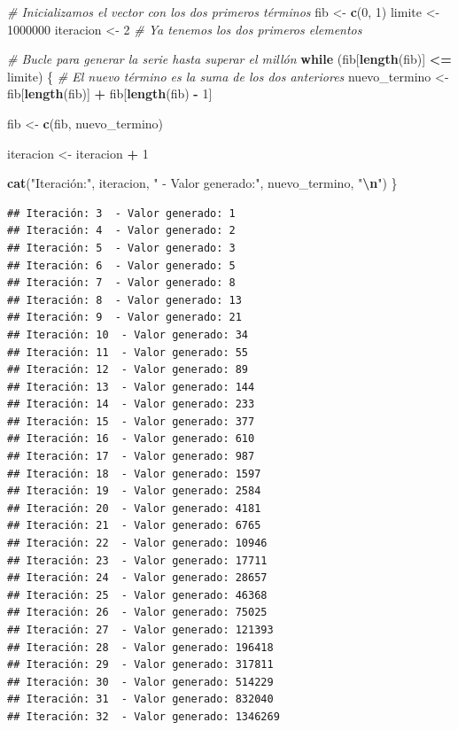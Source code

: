 \documentclass[]{llncs}
\newenvironment{Shaded}{\begin{snugshade}}{\end{snugshade}}
\newcommand{\CommentTok}[1]{\textcolor[rgb]{0.56,0.35,0.01}{\textit{#1}}}
\newcommand{\ControlFlowTok}[1]{\textcolor[rgb]{0.13,0.29,0.53}{\textbf{#1}}}
\newcommand{\DecValTok}[1]{\textcolor[rgb]{0.00,0.00,0.81}{#1}}
\newcommand{\FunctionTok}[1]{\textcolor[rgb]{0.13,0.29,0.53}{\textbf{#1}}}
\newcommand{\NormalTok}[1]{#1}
\newcommand{\OtherTok}[1]{\textcolor[rgb]{0.56,0.35,0.01}{#1}}
\newcommand{\SpecialCharTok}[1]{\textcolor[rgb]{0.81,0.36,0.00}{\textbf{#1}}}
\newcommand{\StringTok}[1]{\textcolor[rgb]{0.31,0.60,0.02}{#1}}
\begin{document}
\begin{Shaded}
\begin{Highlighting}[]
\CommentTok{\# Inicializamos el vector con los dos primeros términos}
\NormalTok{fib }\OtherTok{\textless{}{-}} \FunctionTok{c}\NormalTok{(}\DecValTok{0}\NormalTok{, }\DecValTok{1}\NormalTok{)}
\NormalTok{limite }\OtherTok{\textless{}{-}} \DecValTok{1000000}
\NormalTok{iteracion }\OtherTok{\textless{}{-}} \DecValTok{2} \CommentTok{\# Ya tenemos los dos primeros elementos}

\CommentTok{\# Bucle para generar la serie hasta superar el millón}
\ControlFlowTok{while}\NormalTok{ (fib[}\FunctionTok{length}\NormalTok{(fib)] }\SpecialCharTok{\textless{}=}\NormalTok{ limite) \{}
\CommentTok{\# El nuevo término es la suma de los dos anteriores}
\NormalTok{  nuevo\_termino }\OtherTok{\textless{}{-}}\NormalTok{ fib[}\FunctionTok{length}\NormalTok{(fib)] }\SpecialCharTok{+}\NormalTok{ fib[}\FunctionTok{length}\NormalTok{(fib) }\SpecialCharTok{{-}} \DecValTok{1}\NormalTok{]}
  
\NormalTok{  fib }\OtherTok{\textless{}{-}} \FunctionTok{c}\NormalTok{(fib, nuevo\_termino)}
  
\NormalTok{  iteracion }\OtherTok{\textless{}{-}}\NormalTok{ iteracion }\SpecialCharTok{+} \DecValTok{1}
  
  \FunctionTok{cat}\NormalTok{(}\StringTok{"Iteración:"}\NormalTok{, iteracion, }\StringTok{" {-} Valor generado:"}\NormalTok{, nuevo\_termino, }\StringTok{"}\SpecialCharTok{\textbackslash{}n}\StringTok{"}\NormalTok{)}
\NormalTok{\}}
\end{Highlighting}
\end{Shaded}

\begin{verbatim}
## Iteración: 3  - Valor generado: 1 
## Iteración: 4  - Valor generado: 2 
## Iteración: 5  - Valor generado: 3 
## Iteración: 6  - Valor generado: 5 
## Iteración: 7  - Valor generado: 8 
## Iteración: 8  - Valor generado: 13 
## Iteración: 9  - Valor generado: 21 
## Iteración: 10  - Valor generado: 34 
## Iteración: 11  - Valor generado: 55 
## Iteración: 12  - Valor generado: 89 
## Iteración: 13  - Valor generado: 144 
## Iteración: 14  - Valor generado: 233 
## Iteración: 15  - Valor generado: 377 
## Iteración: 16  - Valor generado: 610 
## Iteración: 17  - Valor generado: 987 
## Iteración: 18  - Valor generado: 1597 
## Iteración: 19  - Valor generado: 2584 
## Iteración: 20  - Valor generado: 4181 
## Iteración: 21  - Valor generado: 6765 
## Iteración: 22  - Valor generado: 10946 
## Iteración: 23  - Valor generado: 17711 
## Iteración: 24  - Valor generado: 28657 
## Iteración: 25  - Valor generado: 46368 
## Iteración: 26  - Valor generado: 75025 
## Iteración: 27  - Valor generado: 121393 
## Iteración: 28  - Valor generado: 196418 
## Iteración: 29  - Valor generado: 317811 
## Iteración: 30  - Valor generado: 514229 
## Iteración: 31  - Valor generado: 832040 
## Iteración: 32  - Valor generado: 1346269
\end{verbatim}
\end{document}
